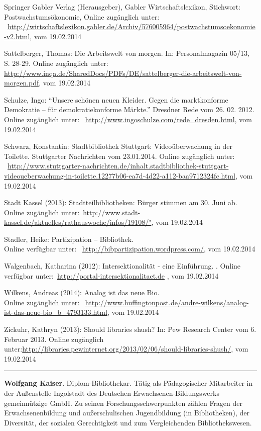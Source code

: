 \documentclass[a4paper,
fontsize=11pt,
oneside,
numbers=noperiodatend,
parskip=half-,
bibliography=totoc,
final
]{scrartcl}
\begin{document}
Springer Gabler Verlag (Herausgeber), Gabler Wirtschaftslexikon,
Stichwort: Postwachstums\-ökonomie, Online zugänglich
unter: \\ ~\url{http://wirtschaftslexikon.gabler.de/Archiv/576005964/postwachstumsoekonomie-v2.html},
vom 19.02.2014

Sattelberger, Thomas: Die Arbeitswelt von morgen. In: Personalmagazin
05/13, S. 28-29. Online zugänglich unter:~
\url{http://www.inqa.de/SharedDocs/PDFs/DE/sattelberger-die-arbeitswelt-von-morgen.pdf},
vom 19.02.2014

Schulze, Ingo: \enquote{Unsere schönen neuen Kleider. Gegen die
marktkonforme Demokratie -- für demokratiekonforme Märkte.} Dresdner
Rede vom 26. 02. 2012. Online zugänglich unter:~
\url{http://www.ingoschulze.com/rede_dresden.html}, vom 19.02.2014

Schwarz, Konstantin: Stadtbibliothek Stuttgart: Videoüberwachung in der
Toilette. Stuttgarter Nachrichten vom 23.01.2014. Online zugänglich
unter: \\ ~\url{http://www.stuttgarter-nachrichten.de/inhalt.stadtbibliothek-stuttgart-videoueberwachung-in-toilette.12277b06-ea7d-4d22-a112-baa9712324fc.html},
vom 19.02.2014

Stadt Kassel (2013): Stadtteilbibliotheken: Bürger stimmen am 30. Juni
ab. Online zugänglich
unter:~\url{http://www.stadt-kassel.de/aktuelles/rathauswoche/infos/19108/"},
vom 19.02.2014

Stadler, Heike: Partizipation -- Bibliothek. \\ Online verfügbar unter:~
\url{http://bibpartizipation.wordpress.com/}, vom 19.02.2014

Walgenbach, Katharina (2012): Intersektionalität - eine Einführung. .
Online verfügbar unter:~\url{http://portal-intersektionalitaet.de} , vom 19.02.2014

Wilkens, Andreas (2014): Analog ist das neue Bio. \\ Online zugänglich
unter:~
\url{http://www.huffingtonpost.de/andre-wilkens/analog-ist-das-neue-bio_b_4793133.html},
vom 19.02.2014

Zickuhr, Kathryn (2013): Should libraries shush? In: Pew Research Center
vom 6. Februar 2013. Online zugänglich
unter:\url{http://libraries.pewinternet.org/2013/02/06/should-libraries-shush/},
vom 19.02.2014

\begin{center}\rule{3in}{0.4pt}\end{center}

\textbf{Wolfgang Kaiser}. Diplom-Bibliothekar. Tätig als Pädagogischer
Mitarbeiter in der Außenstelle Ingolstadt des Deutschen
Erwachsenen-Bildungswerks gemeinnützige GmbH. Zu seinen
Forschungsschwerpunkten zählen Fragen der Erwachsenenbildung und
außerschulischen Jugendbildung (in Bibliotheken), der Diversität, der
sozialen Gerechtigkeit und zum Vergleichenden Bibliothekswesen.
\end{document}
